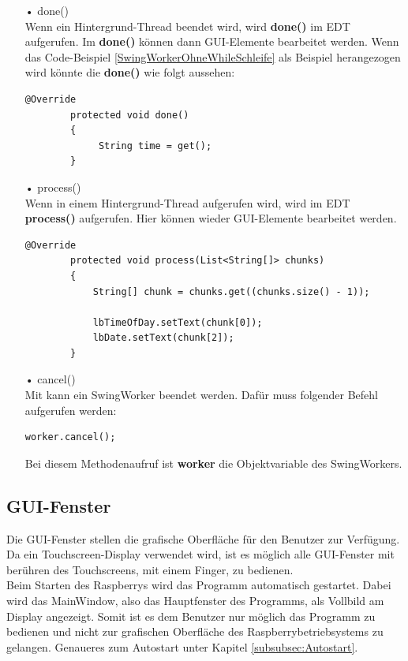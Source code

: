 \begin{itemize}
\item[•] done()
\\ Wenn ein Hintergrund-Thread beendet wird, wird \textbf{done()} im \ac{EDT} aufgerufen. Im \textbf{done()} können dann \ac{GUI}-Elemente bearbeitet werden. Wenn das Code-Beispiel \ref{SwingWorkerOhneWhileSchleife} als Beispiel herangezogen wird könnte die \textbf{done()} wie folgt aussehen:
\begin{lstlisting}[style=JavaStyle, caption=SwingWorker done()]
        @Override
        protected void done()
        {
             String time = get();
        }
\end{lstlisting}
\item[•] process()
\\ Wenn in einem Hintergrund-Thread  aufgerufen wird, wird im \ac{EDT} \textbf{process()} aufgerufen. Hier können wieder \ac{GUI}-Elemente bearbeitet werden.
\begin{lstlisting}[style=JavaStyle, caption=SwingWorker process()]
        @Override
        protected void process(List<String[]> chunks)
        {
            String[] chunk = chunks.get((chunks.size() - 1));
            
            lbTimeOfDay.setText(chunk[0]);
            lbDate.setText(chunk[2]);
        }
\end{lstlisting}

\newpage

\item[•] cancel()
\\ Mit  kann ein SwingWorker beendet werden. Dafür muss folgender Befehl aufgerufen werden:
\begin{lstlisting}[style=JavaStyle, caption=SwingWorker abbrechen]
	    worker.cancel();
\end{lstlisting}
Bei diesem Methodenaufruf ist \textbf{worker} die Objektvariable des SwingWorkers.
\end{itemize}

\subsection{GUI-Fenster}
Die \ac{GUI}-Fenster stellen die grafische Oberfläche für den Benutzer zur Verfügung. Da ein Touchscreen-Display verwendet wird, ist es möglich alle \ac{GUI}-Fenster mit berühren des Touchscreens, mit einem Finger, zu bedienen. 
\\ Beim Starten des Raspberrys wird das Programm automatisch gestartet. Dabei wird das MainWindow, also das Hauptfenster des Programms, als Vollbild am Display angezeigt. Somit ist es dem Benutzer nur möglich das Programm zu bedienen und nicht zur grafischen Oberfläche des Raspberrybetriebsystems zu gelangen. Genaueres zum Autostart unter Kapitel \ref{subsubsec:Autostart}.

